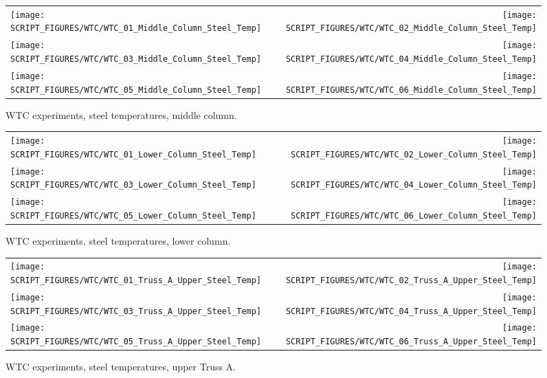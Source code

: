 \begin{figure}[p]
\begin{tabular*}{\textwidth}{l@{\extracolsep{\fill}}r}
\texttt{[image: SCRIPT\_FIGURES/WTC/WTC\_01\_Middle\_Column\_Steel\_Temp]} &
\texttt{[image: SCRIPT\_FIGURES/WTC/WTC\_02\_Middle\_Column\_Steel\_Temp]} \\
\texttt{[image: SCRIPT\_FIGURES/WTC/WTC\_03\_Middle\_Column\_Steel\_Temp]} &
\texttt{[image: SCRIPT\_FIGURES/WTC/WTC\_04\_Middle\_Column\_Steel\_Temp]} \\
\texttt{[image: SCRIPT\_FIGURES/WTC/WTC\_05\_Middle\_Column\_Steel\_Temp]} &
\texttt{[image: SCRIPT\_FIGURES/WTC/WTC\_06\_Middle\_Column\_Steel\_Temp]}
\end{tabular*}
\caption{WTC experiments, steel temperatures, middle column.}
\label{NIST_WTC_Middle_Column_Steel}
\end{figure}

\begin{figure}[p]
\begin{tabular*}{\textwidth}{l@{\extracolsep{\fill}}r}
\texttt{[image: SCRIPT\_FIGURES/WTC/WTC\_01\_Lower\_Column\_Steel\_Temp]} &
\texttt{[image: SCRIPT\_FIGURES/WTC/WTC\_02\_Lower\_Column\_Steel\_Temp]} \\
\texttt{[image: SCRIPT\_FIGURES/WTC/WTC\_03\_Lower\_Column\_Steel\_Temp]} &
\texttt{[image: SCRIPT\_FIGURES/WTC/WTC\_04\_Lower\_Column\_Steel\_Temp]} \\
\texttt{[image: SCRIPT\_FIGURES/WTC/WTC\_05\_Lower\_Column\_Steel\_Temp]} &
\texttt{[image: SCRIPT\_FIGURES/WTC/WTC\_06\_Lower\_Column\_Steel\_Temp]}
\end{tabular*}
\caption{WTC experiments, steel temperatures, lower column.}
\label{NIST_WTC_Lower_Column_Steel}
\end{figure}

\begin{figure}[p]
\begin{tabular*}{\textwidth}{l@{\extracolsep{\fill}}r}
\texttt{[image: SCRIPT\_FIGURES/WTC/WTC\_01\_Truss\_A\_Upper\_Steel\_Temp]} &
\texttt{[image: SCRIPT\_FIGURES/WTC/WTC\_02\_Truss\_A\_Upper\_Steel\_Temp]} \\
\texttt{[image: SCRIPT\_FIGURES/WTC/WTC\_03\_Truss\_A\_Upper\_Steel\_Temp]} &
\texttt{[image: SCRIPT\_FIGURES/WTC/WTC\_04\_Truss\_A\_Upper\_Steel\_Temp]} \\
\texttt{[image: SCRIPT\_FIGURES/WTC/WTC\_05\_Truss\_A\_Upper\_Steel\_Temp]} &
\texttt{[image: SCRIPT\_FIGURES/WTC/WTC\_06\_Truss\_A\_Upper\_Steel\_Temp]}
\end{tabular*}
\caption{WTC experiments, steel temperatures, upper Truss A.}
\label{NIST_WTC_Truss_A_Upper_Steel_Temp}
\end{figure}

